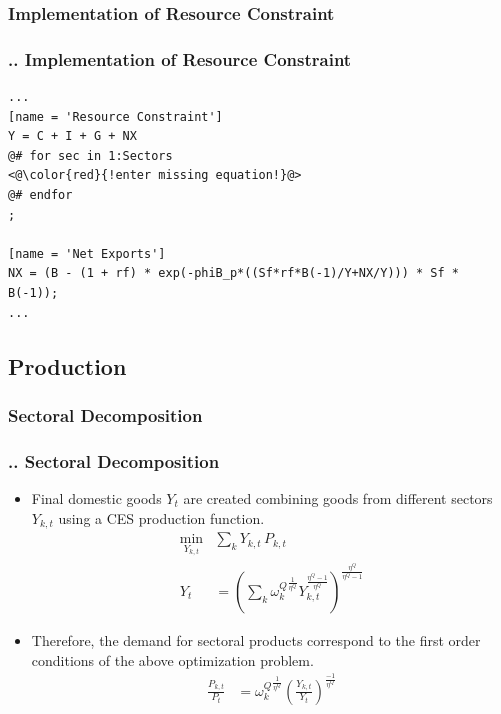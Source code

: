 \documentclass[11pt,aspectratio=169]{beamer}
\begin{document}
\subsubsection{Implementation of Resource Constraint}
\begin{frame}[fragile]
\frametitle{{\thesection.\thesubsection.\thesubsubsection} Implementation of Resource Constraint}

\begin{lstlisting}[frame = single]
...
[name = 'Resource Constraint']
Y = C + I + G + NX
@# for sec in 1:Sectors
<@\color{red}{!enter missing equation!}@>
@# endfor
;

[name = 'Net Exports']
NX = (B - (1 + rf) * exp(-phiB_p*((Sf*rf*B(-1)/Y+NX/Y))) * Sf * B(-1));
...
\end{lstlisting}
\end{frame}
%
\subsection{Production}

\subsubsection{Sectoral Decomposition}
\begin{frame}
\frametitle{{\thesection.\thesubsection.\thesubsubsection} Sectoral Decomposition}
\scriptsize
\begin{itemize}
\item Final domestic goods $Y_{t}$ are created combining goods from different sectors $Y_{k,t}$ using a CES production function.
\begin{align}
\underset{Y_{k,t}}{\mathrm{min}} & \sum_{k} Y_{k,t} \, P_{k,t} \\ 
Y_{t} &= \left(\sum_{k} {\omega^{Q}_{k}}^{\frac{1}{\eta^Q}} Y_{k,t}^{\frac{\eta^Q-1}{\eta^Q}} \right)^{\frac{\eta^Q}{\eta^Q-1}}
\end{align}

\item Therefore, the demand for sectoral products correspond to the first order conditions of the above optimization problem. 
\begin{align*}
\frac{P_{k,t}}{P_{t}} &= {\omega^{Q}_{k}}^{\frac{1}{\eta^Q}} \left(\frac{Y_{k,t}}{Y_{t}}\right)^{\frac{-1}{\eta^Q}}
\end{align*}
\end{itemize}
\end{frame}
\end{document}
